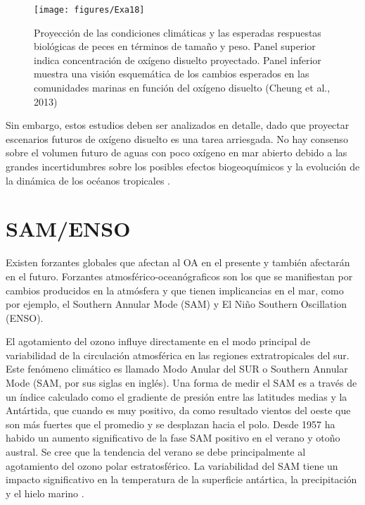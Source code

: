 \documentclass{sydneythesis}
\begin{document}
\newpage

\begin{figure}

{\centering \texttt{[image: figures/Exa18]} 

}

\caption{Proyección de las condiciones climáticas y las esperadas respuestas biológicas de peces en términos de tamaño y peso. Panel superior indica concentración de oxígeno disuelto proyectado. Panel inferior muestra una visión esquemática de los cambios esperados en las comunidades marinas en función del oxígeno disuelto (Cheung et al., 2013)}\label{fig:unnamed-chunk-3}
\end{figure}

Sin embargo, estos estudios deben ser analizados en detalle, dado que proyectar escenarios futuros de oxígeno disuelto es una tarea arriesgada. No hay consenso sobre el volumen futuro de aguas con poco oxígeno en mar abierto debido a las grandes incertidumbres sobre los posibles efectos biogeoquímicos y la evolución de la dinámica de los océanos tropicales \autocite{IPCC2014}.

\hypertarget{samenso}{%
\section{SAM/ENSO}\label{samenso}}

Existen forzantes globales que afectan al OA en el presente y también afectarán en el futuro. Forzantes atmosférico-oceanógraficos son los que se manifiestan por cambios producidos en la atmósfera y que tienen implicancias en el mar, como por ejemplo, el Southern Annular Mode (SAM) y El Niño Southern Oscillation (ENSO).

El agotamiento del ozono influye directamente en el modo principal de variabilidad de la circulación atmosférica en las regiones extratropicales del sur. Este fenómeno climático es llamado Modo Anular del SUR o Southern Annular Mode (SAM, por sus siglas en inglés). Una forma de medir el SAM es a través de un índice calculado como el gradiente de presión entre las latitudes medias y la Antártida, que cuando es muy positivo, da como resultado vientos del oeste que son más fuertes que el promedio y se desplazan hacia el polo. Desde 1957 ha habido un aumento significativo de la fase SAM positivo en el verano y otoño austral. Se cree que la tendencia del verano se debe principalmente al agotamiento del ozono polar estratosférico. La variabilidad del SAM tiene un impacto significativo en la temperatura de la superficie antártica, la precipitación y el hielo marino \autocite{Marshall2018}.
\end{document}
